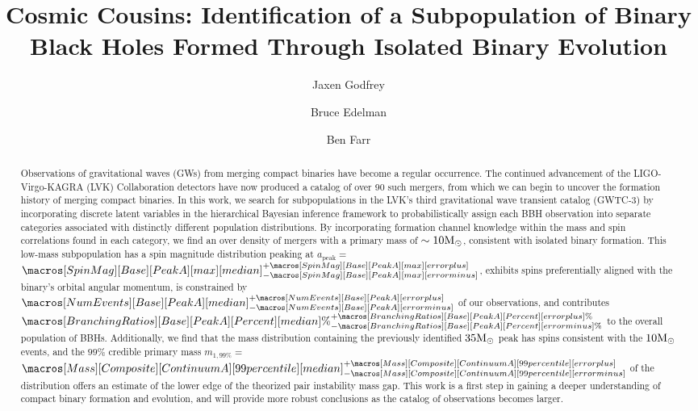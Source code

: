 \documentclass[twocolumn]{aastex631}
\newcommand{\CIPlusMinus}[1]{{#1[median]^{+#1[error plus]}_{-#1[error minus]}}}
\newcommand{\CIPlusMinusPer}[1]{{#1[median]\%^{+#1[error plus]\%}_{-#1[error minus]\%}}}
\newcommand{\msun}{\ensuremath{{\rm M}_\odot}}
\newcommand{\result}[1]{\textcolor{red}{#1}}
\begin{document}
\title{Cosmic Cousins: Identification of a Subpopulation of Binary Black Holes Formed Through Isolated Binary Evolution}

\author{Jaxen Godfrey}
\author{Bruce Edelman}
\author{Ben Farr}

\begin{abstract}
    Observations of gravitational waves (GWs) from merging compact binaries have become a regular occurrence. The continued advancement of the LIGO-Virgo-KAGRA (LVK) Collaboration detectors have now produced a catalog of over 90 such mergers, from which we can begin to uncover the formation history of merging compact binaries. In this work, we search for subpopulations in the LVK's third gravitational wave transient catalog (GWTC-3) by incorporating discrete latent variables in the hierarchical Bayesian inference framework to probabilistically assign each BBH observation into separate categories associated with distinctly different population distributions. By incorporating formation channel knowledge within the mass and spin correlations found in each category, we find an over density of mergers with a primary mass of $\sim10\msun$, consistent with isolated binary formation. This low-mass subpopulation has a spin magnitude distribution peaking at $a_\mathrm{peak}=$ \result{$\CIPlusMinus{\macros[SpinMag][Base][PeakA][max]}$}, exhibits spins preferentially aligned with the binary's orbital angular momentum, is constrained by \result{$\CIPlusMinus{\macros[NumEvents][Base][PeakA]}$} of our observations, and contributes \result{$\CIPlusMinusPer{\macros[BranchingRatios][Base][PeakA][Percent]}$} to the overall population of BBHs. Additionally, we find that the mass distribution containing the previously identified $35\msun$ peak has spins consistent with the $10\msun$ events, and the $99\%$ credible primary mass $m_{1,99\%} = $ \result{$\CIPlusMinus{\macros[Mass][Composite][ContinuumA][99percentile]}$} of the distribution offers an estimate of the lower edge of the theorized pair instability mass gap. This work is a first step in gaining a deeper understanding of compact binary formation and evolution, and will provide more robust conclusions as the catalog of observations becomes larger. 
\end{abstract}
\end{document}
